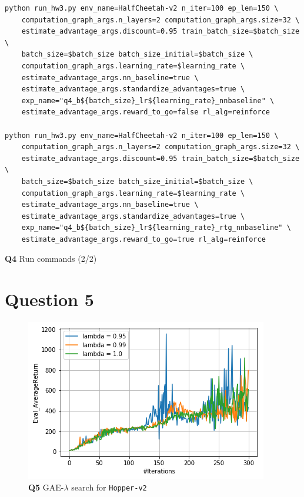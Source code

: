 \documentclass[11pt]{article}
\begin{document}
\begin{listing}[htbp]
\begin{verbatim}
python run_hw3.py env_name=HalfCheetah-v2 n_iter=100 ep_len=150 \
    computation_graph_args.n_layers=2 computation_graph_args.size=32 \
    estimate_advantage_args.discount=0.95 train_batch_size=$batch_size \
    batch_size=$batch_size batch_size_initial=$batch_size \
    computation_graph_args.learning_rate=$learning_rate \
    estimate_advantage_args.nn_baseline=true \
    estimate_advantage_args.standardize_advantages=true \
    exp_name="q4_b${batch_size}_lr${learning_rate}_nnbaseline" \
    estimate_advantage_args.reward_to_go=false rl_alg=reinforce

python run_hw3.py env_name=HalfCheetah-v2 n_iter=100 ep_len=150 \
    computation_graph_args.n_layers=2 computation_graph_args.size=32 \
    estimate_advantage_args.discount=0.95 train_batch_size=$batch_size \
    batch_size=$batch_size batch_size_initial=$batch_size \
    computation_graph_args.learning_rate=$learning_rate \
    estimate_advantage_args.nn_baseline=true \
    estimate_advantage_args.standardize_advantages=true \
    exp_name="q4_b${batch_size}_lr${learning_rate}_rtg_nnbaseline" \
    estimate_advantage_args.reward_to_go=true rl_alg=reinforce
\end{verbatim}
\caption{\textbf{Q4} Run commands (2/2)}
\end{listing}

\clearpage
\section{Question 5}
\label{sec:org65f1a97}

\begin{figure}[htbp]
\centering
\includegraphics[width=.9\linewidth]{./5.png}
\caption{\textbf{Q5} GAE-\(\lambda\) search for \texttt{Hopper-v2}}
\end{figure}
\end{document}
